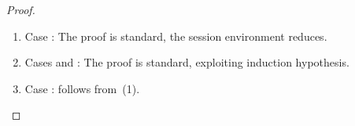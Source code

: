 \begin{proof}
\begin{enumerate}[1.]
		\item	Case :
			The proof is standard, the session environment reduces.


		\item	Cases  and :
			The proof is standard, exploiting induction hypothesis. 

		\item	Case :
			follows from \,(1).
	\end{enumerate}
\end{proof}

